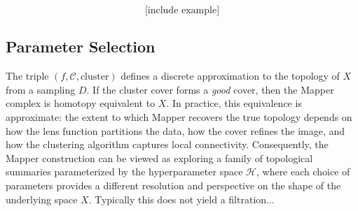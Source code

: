 $$\text{[include example]}$$

\subsection{Parameter Selection}
The triple $(f, \mathcal{C}, \text{cluster})$ defines a discrete 
approximation to the topology of $X$ from a sampling $D$. If the cluster cover forms a \emph{good} cover, then 
the Mapper complex is homotopy equivalent to $X$. In practice, this equivalence 
is approximate: the extent to which Mapper recovers the true topology depends 
on how the lens function partitions the data, how the cover refines the image, 
and how the clustering algorithm captures local connectivity. Consequently, 
the Mapper construction can be viewed as exploring a family of topological 
summaries parameterized by the hyperparameter space $\mathcal{H}$, where each 
choice of parameters provides a different resolution and perspective on the 
shape of the underlying space $X$. Typically this does not yield a filtration...
